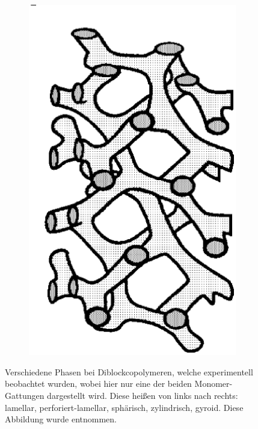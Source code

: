 \documentclass[../main.tex]{subfiles}
\begin{document}
\begin{figure}[tb]
\begin{subfigure}[b]{0.15\textwidth}
        \includegraphics[width=\textwidth]{figures/einleitung/phase5}
    \end{subfigure}
    \caption[Verschiedene Phasen bei Diblockcopolymeren]{%
        Verschiedene Phasen bei Diblockcopolymeren, welche experimentell beobachtet wurden, wobei hier nur eine der beiden Monomer-Gattungen dargestellt wird.
        Diese heißen von links nach rechts: lamellar, perforiert-lamellar, sphärisch, zylindrisch, gyroid.
        Diese Abbildung wurde \cite[Figure 1.18]{Matsen:2006ud} entnommen.
    }
    \label{figure:phasen}
\end{figure}
\end{document}
